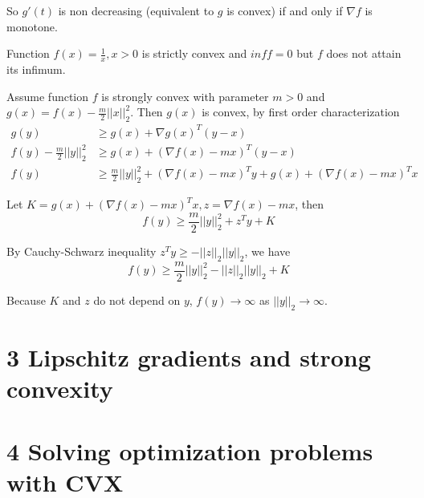 \documentclass[12pt,letterpaper]{article}
\begin{document}
\begin{alphalist}
    So $g'(t)$ is non decreasing (equivalent to $g$ is convex) if and only if $\nabla f$ is monotone.

\item
    Function $f(x) = \frac{1}{x}, x > 0$ is strictly convex and $inf f = 0$ but
    $f$ does not attain its infimum.

\item
    Assume function $f$ is strongly convex with parameter $m > 0$ and  $g(x) =
    f(x) - \frac{m}{2} ||x||_2^2$. Then $g(x)$ is convex, by first order
    characterization
    \[
        \begin{split}
            g(y) &\ge g(x) + \nabla g(x)^T(y - x) \\
            f(y) - \frac{m}{2}||y||_2^2 &\ge g(x) + (\nabla f(x) - mx)^T(y -
            x)\\
            f(y) &\ge \frac{m}{2}||y||_2^2 + (\nabla f(x) - mx)^Ty + g(x) + (\nabla f(x) - mx)^Tx
        \end{split}
    \]

    Let $K = g(x) + (\nabla f(x) - mx)^Tx, z = \nabla f(x) - mx$, then
    \[
        f(y) \ge \frac{m}{2}||y||_2^2 + z^Ty + K
    \]

    By Cauchy-Schwarz inequality $z^Ty \ge - ||z||_2||y||_2$, we have
    \[
        f(y) \ge \frac{m}{2}||y||_2^2 - ||z||_2 ||y||_2 + K
    \]

    Because $K$ and $z$ do not depend on $y$, $f(y) \to \infty$ as $||y||_2 \to
    \infty$.

\end{alphalist}

\newpage
\section*{3 Lipschitz gradients and strong convexity}

\newpage
\section*{4 Solving optimization problems with CVX}
\end{document}
